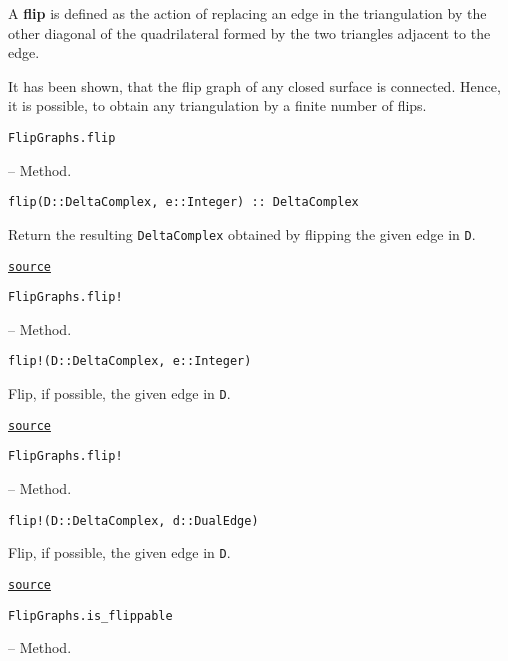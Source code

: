 \label{17856663285825007015}{}


A \textbf{flip} is defined as the action of replacing an edge in the triangulation by the other diagonal of the quadrilateral formed by the two triangles adjacent to the edge.



It has been shown, that the flip graph of any closed surface is connected. Hence, it is possible, to obtain any triangulation by a finite number of flips.


\hypertarget{10138197749309540155}{\texttt{FlipGraphs.flip}}  -- {Method.}

\begin{adjustwidth}{2em}{0pt}


\begin{verbatim}
flip(D::DeltaComplex, e::Integer) :: DeltaComplex
\end{verbatim}

Return the resulting \texttt{DeltaComplex} obtained by flipping the given edge in \texttt{D}.



\href{https://github.com/schto223/FlipGraphs.jl/blob/490c01a7adf74b42f27dda05099165c47ae8133e/src/deltaComplex.jl#L860-L864}{\texttt{source}}


\end{adjustwidth}
\hypertarget{18117735675891637030}{\texttt{FlipGraphs.flip!}}  -- {Method.}

\begin{adjustwidth}{2em}{0pt}


\begin{verbatim}
flip!(D::DeltaComplex, e::Integer)
\end{verbatim}

Flip, if possible, the given edge in \texttt{D}.



\href{https://github.com/schto223/FlipGraphs.jl/blob/490c01a7adf74b42f27dda05099165c47ae8133e/src/deltaComplex.jl#L871-L875}{\texttt{source}}


\end{adjustwidth}
\hypertarget{5822682659714476017}{\texttt{FlipGraphs.flip!}}  -- {Method.}

\begin{adjustwidth}{2em}{0pt}


\begin{verbatim}
flip!(D::DeltaComplex, d::DualEdge)
\end{verbatim}

Flip, if possible, the given edge in \texttt{D}.



\href{https://github.com/schto223/FlipGraphs.jl/blob/490c01a7adf74b42f27dda05099165c47ae8133e/src/deltaComplex.jl#L878-L882}{\texttt{source}}


\end{adjustwidth}
\hypertarget{2770587389040278334}{\texttt{FlipGraphs.is\_flippable}}  -- {Method.}

